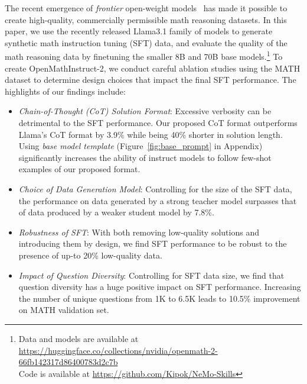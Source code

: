 The recent emergence of \emph{frontier} open-weight models~\citep{dubey2024llama3herdmodels, deepseekai2024deepseekv2strongeconomicalefficient} has made it possible to create high-quality, commercially permissible math reasoning datasets. 
In this paper, we use the recently released Llama3.1 family of models to generate synthetic math instruction tuning (SFT) data, and evaluate the quality of the math reasoning data by finetuning the smaller 8B and 70B base models.\footnote{
Data and models are available at \url{https://huggingface.co/collections/nvidia/openmath-2-66fb142317d86400783d2c7b}\\
Code is available at \url{https://github.com/Kipok/NeMo-Skills}}   
To create OpenMathInstruct-2, we conduct careful ablation studies using the MATH dataset to determine design choices that impact the final SFT performance. The highlights of our findings include:
\begin{itemize}
    \item  \emph{Chain-of-Thought (CoT) Solution Format}: Excessive verbosity can be detrimental to the SFT performance. Our proposed CoT format outperforms Llama's CoT format by 3.9\% while being 40\% shorter in solution length. Using \emph{base model template} (Figure~\ref{fig:base_prompt} in Appendix) significantly increases the ability of instruct models to follow few-shot examples of our proposed format.
    \item \emph{Choice of Data Generation Model}: 
    Controlling for the size of the SFT data, the performance on data generated by a strong teacher model surpasses that of data produced by a weaker student model by 7.8\%.
    \item \emph{Robustness of SFT}: 
    With both removing low-quality solutions and introducing them by design, we find SFT performance to be robust to the presence of up-to 20\% low-quality data. 
    \item \emph{Impact of Question Diversity}: 
    Controlling for SFT data size, we find that question diversity has a huge positive impact on SFT performance. Increasing the number of unique questions from 1K to 6.5K leads to 10.5\% improvement on MATH validation set.
\end{itemize}



